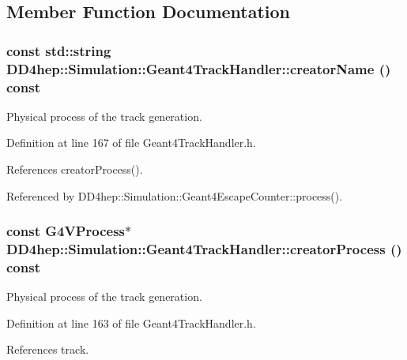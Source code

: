 \subsection{Member Function Documentation}
\hypertarget{class_d_d4hep_1_1_simulation_1_1_geant4_track_handler_a12603b39059e2c20a5bca9c3389da596}{
\subsubsection[{creatorName}]{\setlength{\rightskip}{0pt plus 5cm}const std::string DD4hep::Simulation::Geant4TrackHandler::creatorName () const}}
\label{class_d_d4hep_1_1_simulation_1_1_geant4_track_handler_a12603b39059e2c20a5bca9c3389da596}


Physical process of the track generation. 

Definition at line 167 of file Geant4TrackHandler.h.

References creatorProcess().

Referenced by DD4hep::Simulation::Geant4EscapeCounter::process().\hypertarget{class_d_d4hep_1_1_simulation_1_1_geant4_track_handler_a58d18fef161e0f06bd860e0a67c3db48}{
\subsubsection[{creatorProcess}]{\setlength{\rightskip}{0pt plus 5cm}const G4VProcess$\ast$ DD4hep::Simulation::Geant4TrackHandler::creatorProcess () const}}
\label{class_d_d4hep_1_1_simulation_1_1_geant4_track_handler_a58d18fef161e0f06bd860e0a67c3db48}


Physical process of the track generation. 

Definition at line 163 of file Geant4TrackHandler.h.

References track.

